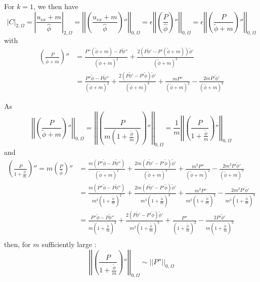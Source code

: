 For $k=1$, we then have
\begin{equation*}
	|C|_{2,\Omega}=\left|\frac{u_{ex}+m}{\hat{\phi}}\right|_{2,\Omega}=\left|\left|\left(\frac{u_{ex}+m}{\hat{\phi}}\right)''\right|\right|_{0,\Omega}=\epsilon\left|\left|\left(\frac{P}{\hat{\phi}}\right)''\right|\right|_{0,\Omega}=\epsilon\left|\left|\left(\frac{P}{\tilde{\phi}+m}\right)''\right|\right|_{0,\Omega}
\end{equation*}
with
\begin{align*}
	\left(\frac{P}{\tilde{\phi}+m}\right)''&=\frac{P''(\tilde{\phi}+m)-P\tilde{\phi}''}{(\tilde{\phi}+m)^2}+\frac{2(P\tilde{\phi}'-P'(\tilde{\phi}+m))\tilde{\phi}'}{(\tilde{\phi}+m)^3} \\
	&=\frac{P''\tilde{\phi}-P\tilde{\phi}''}{(\tilde{\phi}+m)^2}+\frac{2(P\tilde{\phi}'-P'\tilde{\phi})\tilde{\phi}'}{(\tilde{\phi}+m)^3}+    \frac{mP''}{(\tilde{\phi}+m)^2}-\frac{2mP'\tilde{\phi}'}{(\tilde{\phi}+m)^3}
\end{align*}

As 
\begin{equation*}
	\left|\left|\left(\frac{P}{\tilde{\phi}+m}\right)''\right|\right|_{0,\Omega}=\left|\left|\left(\frac{P}{m\left(1+\frac{\tilde{\phi}}{m}\right)}\right)''\right|\right|_{0,\Omega}=\frac{1}{m}\left|\left|\left(\frac{P}{1+\frac{\tilde{\phi}}{m}}\right)''\right|\right|_{0,\Omega}
\end{equation*}
and 
\begin{align*}
	\left(\frac{P}{1+\frac{\tilde{\phi}}{m}}\right)''=m\left(\frac{P}{\hat{\phi}}\right)''&=\frac{m(P''\tilde{\phi}-P\tilde{\phi}'')}{(\tilde{\phi}+m)^2}+\frac{2m(P\tilde{\phi}'-P'\tilde{\phi})\tilde{\phi}'}{(\tilde{\phi}+m)^3}+    \frac{m^2P''}{(\tilde{\phi}+m)^2}-\frac{2m^2P'\tilde{\phi}'}{(\tilde{\phi}+m)^3} \\
	&=\frac{m(P''\tilde{\phi}-P\tilde{\phi}'')}{m^2\left(1+\frac{\tilde{\phi}}{m}\right)^2}+\frac{2m(P\tilde{\phi}'-P'\tilde{\phi})\tilde{\phi}'}{m^3\left(1+\frac{\tilde{\phi}}{m}\right)^3}+    \frac{m^2P''}{m^2\left(1+\frac{\tilde{\phi}}{m}\right)^2}-\frac{2m^2P'\tilde{\phi}'}{m^3\left(1+\frac{\tilde{\phi}}{m}\right)^3} \\
	&=\frac{P''\tilde{\phi}-P\tilde{\phi}''}{m\left(1+\frac{\tilde{\phi}}{m}\right)^2}+\frac{2(P\tilde{\phi}'-P'\tilde{\phi})\tilde{\phi}'}{m^2\left(1+\frac{\tilde{\phi}}{m}\right)^3}+    \frac{P''}{\left(1+\frac{\tilde{\phi}}{m}\right)^2}-\frac{2P'\tilde{\phi}'}{m\left(1+\frac{\tilde{\phi}}{m}\right)^3} \\
\end{align*}
then, for $m$ sufficiently large :
\begin{equation*}
	\left|\left|\left(\frac{P}{1+\frac{\tilde{\phi}}{m}}\right)''\right|\right|_{0,\Omega}\sim\left|\left|P''\right|\right|_{0,\Omega}
\end{equation*}

